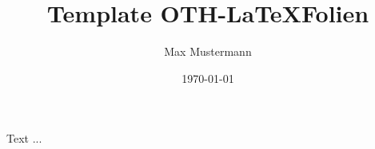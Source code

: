 \documentclass[aspectratio=169,16pt]{beamer}
\title{Template OTH-\LaTeX Folien}
\author{Max Mustermann}
\institute{Fakultät Muster}
\date{\today}
\begin{document}
\maketitle

\begin{frame}
	Text ...
\end{frame}
\end{document}
